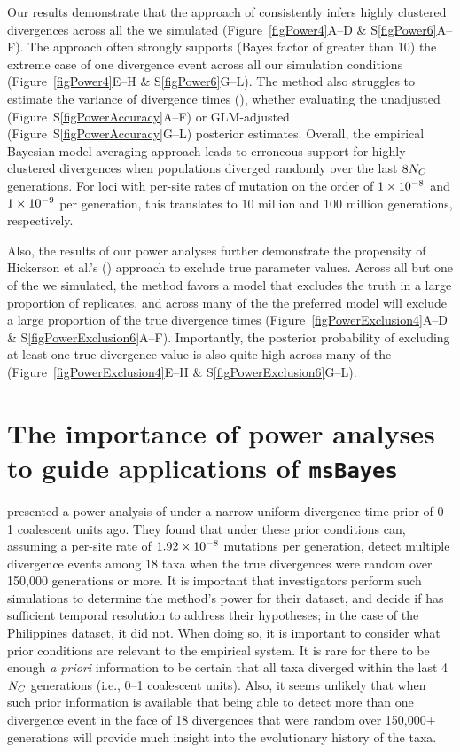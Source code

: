 Our results demonstrate that the approach of \citet{Hickerson2013} consistently
infers highly clustered divergences across all the  we simulated
(Figure~\ref{figPower4}A--D \& S\ref{figPower6}A--F).
The approach often strongly supports (Bayes factor of greater than 10) the
extreme case of one divergence event across all our simulation conditions
(Figure~\ref{figPower4}E--H \& S\ref{figPower6}G--L).
The method also struggles to estimate the variance of divergence times
(\vmratio{}), whether evaluating the unadjusted
(Figure~S\ref{figPowerAccuracy}A--F) or GLM-adjusted
(Figure~S\ref{figPowerAccuracy}G--L) posterior estimates.
Overall, the empirical Bayesian model-averaging approach leads to erroneous
support for highly clustered divergences when populations diverged randomly
over the last $8N_C$ generations.
For loci with per-site rates of mutation on the order of $1\times 10^{-8}$ and
$1\times 10^{-9}$ per generation, this translates to 10 million and 100 million
generations, respectively.

Also, the results of our power analyses further demonstrate the propensity of
Hickerson et al.'s (\citeyear{Hickerson2013}) approach to exclude true
parameter values.
Across all but one of the  we simulated, the method favors a model
that excludes the truth in a large proportion of replicates, and across many of
the  the preferred model will exclude a large proportion of the true
divergence times (Figure~\ref{figPowerExclusion4}A--D \&
S\ref{figPowerExclusion6}A--F).
Importantly, the posterior probability of excluding at least one true
divergence value is also quite high across many of the 
(Figure~\ref{figPowerExclusion4}E--H \& S\ref{figPowerExclusion6}G--L).


\section{The importance of power analyses to guide applications of \texttt{msBayes}}
\citet{Hickerson2013} presented a power analysis of \msb under a narrow uniform
divergence-time prior of 0--1 coalescent units ago.
They found that under these prior conditions \msb can, assuming a
per-site rate of $1.92\times 10^{-8}$ mutations per generation, detect multiple
divergence events among 18 taxa when the true divergences were random over
150,000 generations or more.
It is important that investigators perform such simulations to determine the
method's power for their dataset, and decide if \msb has sufficient temporal
resolution to address their hypotheses; in the case of the Philippines dataset,
it did not.
When doing so, it is important to consider what prior conditions are relevant
to the empirical system.
It is rare for there to be enough \emph{a priori} information to be certain
that all taxa diverged within the last 4$N_C$ generations (i.e.,
0--1 coalescent units).
Also, it seems unlikely that when such prior information is available that
being able to detect more than one divergence event in the face of 18
divergences that were random over 150,000+ generations will
provide much insight into the evolutionary history of the taxa.

